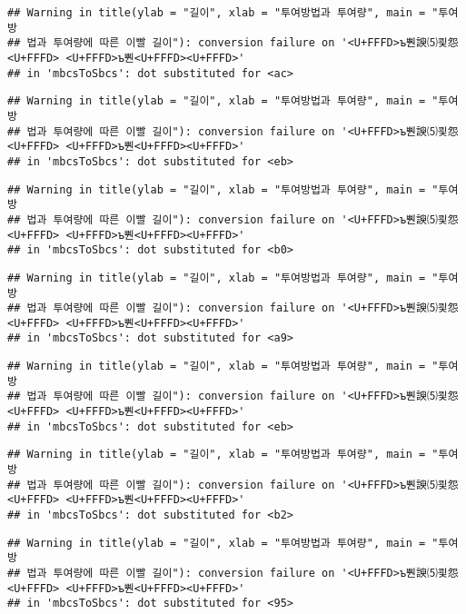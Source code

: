 \documentclass[]{article}
\begin{document}
\begin{verbatim}
## Warning in title(ylab = "길이", xlab = "투여방법과 투여량", main = "투여방
## 법과 투여량에 따른 이빨 길이"): conversion failure on '<U+FFFD>ъ뿬諛⑸쾿怨<U+FFFD> <U+FFFD>ъ뿬<U+FFFD><U+FFFD>'
## in 'mbcsToSbcs': dot substituted for <ac>
\end{verbatim}

\begin{verbatim}
## Warning in title(ylab = "길이", xlab = "투여방법과 투여량", main = "투여방
## 법과 투여량에 따른 이빨 길이"): conversion failure on '<U+FFFD>ъ뿬諛⑸쾿怨<U+FFFD> <U+FFFD>ъ뿬<U+FFFD><U+FFFD>'
## in 'mbcsToSbcs': dot substituted for <eb>
\end{verbatim}

\begin{verbatim}
## Warning in title(ylab = "길이", xlab = "투여방법과 투여량", main = "투여방
## 법과 투여량에 따른 이빨 길이"): conversion failure on '<U+FFFD>ъ뿬諛⑸쾿怨<U+FFFD> <U+FFFD>ъ뿬<U+FFFD><U+FFFD>'
## in 'mbcsToSbcs': dot substituted for <b0>
\end{verbatim}

\begin{verbatim}
## Warning in title(ylab = "길이", xlab = "투여방법과 투여량", main = "투여방
## 법과 투여량에 따른 이빨 길이"): conversion failure on '<U+FFFD>ъ뿬諛⑸쾿怨<U+FFFD> <U+FFFD>ъ뿬<U+FFFD><U+FFFD>'
## in 'mbcsToSbcs': dot substituted for <a9>
\end{verbatim}

\begin{verbatim}
## Warning in title(ylab = "길이", xlab = "투여방법과 투여량", main = "투여방
## 법과 투여량에 따른 이빨 길이"): conversion failure on '<U+FFFD>ъ뿬諛⑸쾿怨<U+FFFD> <U+FFFD>ъ뿬<U+FFFD><U+FFFD>'
## in 'mbcsToSbcs': dot substituted for <eb>
\end{verbatim}

\begin{verbatim}
## Warning in title(ylab = "길이", xlab = "투여방법과 투여량", main = "투여방
## 법과 투여량에 따른 이빨 길이"): conversion failure on '<U+FFFD>ъ뿬諛⑸쾿怨<U+FFFD> <U+FFFD>ъ뿬<U+FFFD><U+FFFD>'
## in 'mbcsToSbcs': dot substituted for <b2>
\end{verbatim}

\begin{verbatim}
## Warning in title(ylab = "길이", xlab = "투여방법과 투여량", main = "투여방
## 법과 투여량에 따른 이빨 길이"): conversion failure on '<U+FFFD>ъ뿬諛⑸쾿怨<U+FFFD> <U+FFFD>ъ뿬<U+FFFD><U+FFFD>'
## in 'mbcsToSbcs': dot substituted for <95>
\end{verbatim}
\end{document}
